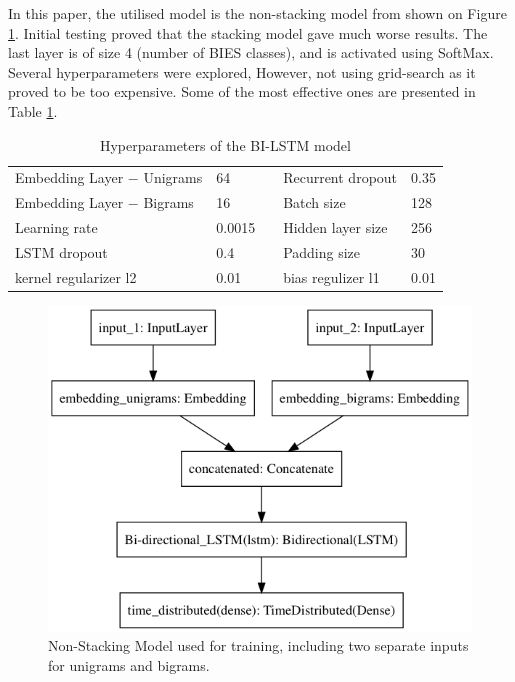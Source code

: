 \documentclass[12pt,a4paper]{article}
\begin{document}
In this paper, the utilised model is the non-stacking model from \cite{paper} shown on Figure \ref{img:model}. Initial testing proved that the stacking model gave much worse results. The last layer is of size 4 (number of BIES classes), and is activated using SoftMax. Several hyperparameters were explored, However, not using grid-search as it proved to be too expensive.
Some of the most effective ones are presented in Table \ref{table:hyper}.

\begin{table}[htb]
\centering
\caption{Hyperparameters of the BI-LSTM model}
\label{table:hyper}
\begin{tabular}{|l|l|l|l|l|}
\cline{1-2} \cline{4-5}
Embedding Layer $-$ Unigrams & 64     &  & Recurrent dropout & 0.35 \\ \cline{1-2} \cline{4-5} 
Embedding Layer $-$ Bigrams  & 16     &  & Batch size        & 128  \\ \cline{1-2} \cline{4-5} 
Learning rate                & 0.0015 &  & Hidden layer size & 256  \\ \cline{1-2} \cline{4-5} 
LSTM dropout                 & 0.4    &  & Padding size      & 30   \\ \cline{1-2} \cline{4-5} 
kernel regularizer l2        & 0.01   &  & bias regulizer l1 & 0.01 \\ \cline{1-2} \cline{4-5} 
\end{tabular}
\end{table}

\begin{figure}[H]

\begin{center}
\includegraphics[width=0.7\columnwidth, angle = 0]{img/model.png}
\end{center}
\caption{Non-Stacking Model used for training, including two separate inputs for unigrams and bigrams.}
\label{img:model}
\end{figure}
\end{document}

